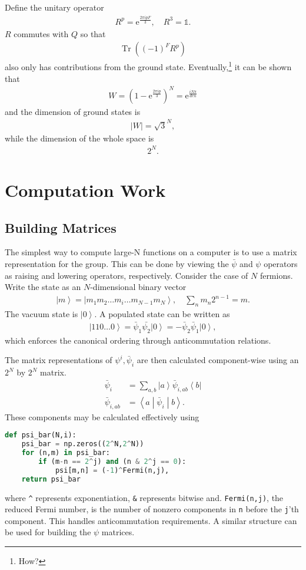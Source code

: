 \documentclass[12pt]{article} %
\newcommand{\abs}[1]{\left|#1\right|}
\newcommand{\e}{\text{e}}
\newcommand{\ket}[1]{\left|#1\right\rangle}
\newcommand{\bra}[1]{\left\langle#1\right|}
\newcommand{\brakett}[3]{\left\langle#1\middle|#2\middle|#3\right\rangle}
\newcommand{\nn}{\nonumber\\}
\DeclareMathOperator{\Tr}{Tr}
\begin{document}
Define the unitary operator 
\begin{align}
R^p = \e^{\frac{2\pi ipF}{3}},\quad R^3 = \mathbb{1}.
\end{align}
$R$ commutes with $Q$ so that
\begin{align}
\Tr\left((-1)^FR^p\right)
\end{align}
also only has contributions from the ground state. Eventually,\footnote{How?} it can be shown that
\begin{align}
W = \left(1-\e^{\frac{2\pi ip}{3}}\right)^N = \e^{\frac{iN\pi}{den}}
\end{align}
and the dimension of ground states is 
\begin{align}
\abs{W} = \sqrt{3}^N,
\end{align}
while the dimension of the whole space is 
\begin{align}
2^N.
\end{align}

\section{Computation Work}

\subsection{Building Matrices}\emph{}

The simplest way to compute large-N functions on a computer is to use a matrix representation for the group. This can be done by viewing the $\bar \psi$ and $\psi$ operators as raising and lowering operators, respectively. Consider the case of $N$ fermions. Write the state as an $N$-dimensional binary vector
\begin{align}
\ket{m} = \ket{m_1m_2\dots m_i\dots m_{N-1}m_N}, \quad\sum_nm_n2^{n-1} =
	m.\label{eqn:2Nstate}
\end{align}
The vacuum state is $\ket{0}$. A populated state can be written as
\begin{align}
\ket{110\dots 0} = \bar\psi_1\bar{\psi_2}\ket{0} =-\bar\psi_2\bar\psi_1\ket{0},
\end{align}
which enforces the canonical ordering through anticommutation relations. 

The matrix representations of $\psi^i, \bar \psi_i$ are then calculated component-wise using an $2^N$ by $2^N$ matrix.
\begin{align}
\bar\psi_i &= \sum_{a,b}\ket{a}\bar\psi_{i,ab}\bra{b}\nn
\bar\psi_{i,ab} &= \brakett{a}{\bar\psi_i}{b}.\label{eqn:comps}
\end{align}
These components may be calculated effectively using
\begin{lstlisting}[language=python]
def psi_bar(N,i):
    psi_bar = np.zeros((2^N,2^N))
    for (n,m) in psi_bar:
        if (m-n == 2^j) and (n & 2^j == 0): 
            psi[m,n] = (-1)^Fermi(n,j),
    return psi_bar
\end{lstlisting}
where \verb|^| represents exponentiation, \verb|&| represents bitwise and. \verb|Fermi(n,j)|, the reduced Fermi number, is the number of nonzero components in \verb|n| before the \verb|j|'th component. This handles anticommutation requirements. A similar structure can be used for building the $\psi$ matrices.
\end{document}
